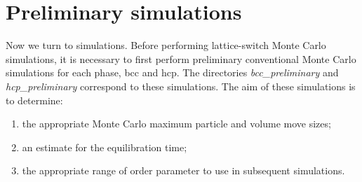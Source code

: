 \documentclass{report}
\begin{document}
\section{Preliminary simulations}
Now we turn to simulations. Before performing lattice-switch Monte Carlo simulations, it is necessary to first perform
preliminary conventional Monte Carlo simulations for each phase, bcc and hcp. The directories \emph{bcc\_preliminary}
and \emph{hcp\_preliminary} correspond to these simulations. The aim of these simulations is to determine:
\begin{enumerate}
\item the appropriate Monte Carlo maximum particle and volume move sizes;
\item an estimate for the equilibration time;
\item the appropriate range of order parameter to use in subsequent simulations.
\end{enumerate}
\end{document}
